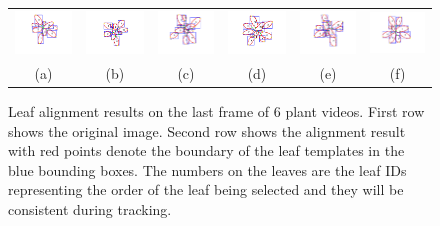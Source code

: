 \begin{figure}
\begin{centering}
\begin{tabular}{c c c c c c}
\includegraphics[trim= 90 60 100 5, clip, width=.14\textwidth]{Figures/AlignPerformance/9_2}&
\includegraphics[trim= 90 60 100 5, clip, width=.14\textwidth]{Figures/AlignPerformance/10_2}&
\includegraphics[trim= 90 60 100 5, clip, width=.14\textwidth]{Figures/AlignPerformance/11_2}&
\includegraphics[trim= 90 60 100 5, clip, width=.14\textwidth]{Figures/AlignPerformance/12_2}&
\includegraphics[trim= 90 60 100 5, clip, width=.14\textwidth]{Figures/AlignPerformance/14_2}&
\includegraphics[trim= 90 60 100 5, clip, width=.14\textwidth]{Figures/AlignPerformance/15_2}\\
(a) & (b) & (c) & (d) & (e) & (f) \\
\end{tabular}
\caption{Leaf alignment results on the last frame of $6$ plant videos. First row shows the original image. Second row shows the alignment result with red points denote the boundary of the leaf templates in the blue bounding boxes. The numbers on the leaves are the leaf IDs representing the order of the leaf being selected and they will be consistent during tracking.}
\label{fig:alignResult}
\end{centering}
\end{figure}



